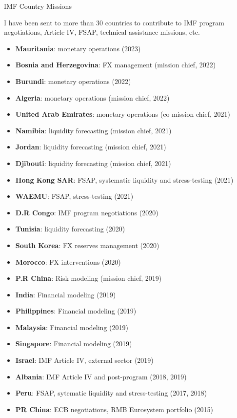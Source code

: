 \documentclass[usegeometry, 10pt, a4paper]{cv} %
\begin{document}
\newpage

\begin{rubriquetableau}[0.95\textwidth]{IMF Country Missions}
  \vspace{-0.5cm}

I have been sent to more than 30 countries to contribute to IMF program negotiations, Article IV, FSAP, technical assistance missions, etc.\\

\begin{multicols}{2}
\begin{itemize}
  \item \textbf{Mauritania}: monetary operations (2023)
  \item \textbf{Bosnia and Herzegovina}: FX management (mission chief, 2022)
  \item \textbf{Burundi}: monetary operations (2022)
  \item \textbf{Algeria}: monetary operations (mission chief, 2022)
  \item \textbf{United Arab Emirates}: monetary operations (co-mission chief, 2021)
  \item \textbf{Namibia}: liquidity forecasting (mission chief, 2021)
  \item \textbf{Jordan}: liquidity forecasting (mission chief, 2021)
  \item \textbf{Djibouti}: liquidity forecasting (mission chief, 2021)
  \item \textbf{Hong Kong SAR}: FSAP, systematic liquidity and stress-testing (2021)
  \item \textbf{WAEMU}: FSAP, stress-testing (2021)
  \item \textbf{D.R Congo}: IMF program negotiations (2020)
  \item \textbf{Tunisia}: liquidity forecasting (2020)
  \item \textbf{South Korea}: FX reserves management (2020)
  \item \textbf{Morocco}: FX interventions (2020)  
  \item \textbf{P.R China}: Risk modeling (mission chief, 2019) 
  \item \textbf{India}: Financial modeling (2019)
  \item \textbf{Philippines}: Financial modeling (2019)
  \item \textbf{Malaysia}: Financial modeling (2019)
  \item \textbf{Singapore}: Financial modeling (2019)
  \item \textbf{Israel}: IMF Article IV, external sector (2019)
  \item \textbf{Albania}: IMF Article IV and post-program (2018, 2019)
  \item \textbf{Peru}: FSAP, sytematic liquidity and stress-testing (2017, 2018)
  \item \textbf{PR China}: ECB negotiations, RMB Eurosystem portfolio (2015)
\end{itemize}


\end{multicols}
\end{rubriquetableau}
\end{document}
